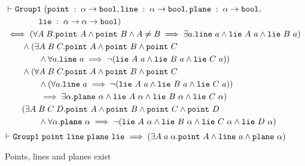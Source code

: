 \begin{figure}
  \begin{align*}
    &\vdash\code{Group1}\ (\code{point}\;:\;\alpha\rightarrow\code{bool}, \code{line}\;:\;\alpha\rightarrow\code{bool},\code{plane}\;:\;\alpha\rightarrow\code{bool},\\
    &\qquad\qquad\code{lie}\;:\;\alpha\rightarrow\alpha\rightarrow\code{bool})\\
    &\iff (\forall A\; B. \code{point}\ A \wedge \code{point}\ B \wedge A \neq B \implies \exists a. \code{line}\ a \wedge \code{lie}\ A\ a \wedge \code{lie}\ B\ a)\\
    &\qquad\wedge (\exists A\;B\;C. \code{point}\ A \wedge \code{point}\ B \wedge \code{point}\ C\\
    &\qquad\qquad\wedge \forall a. \code{line}\ a \implies \neg(\code{lie}\ A\ a \wedge \code{lie}\ B\ a \wedge \code{lie}\ C\ a))\\
    &\qquad\wedge(\forall A\;B\;C. \code{point}\ A \wedge \code{point}\ B \wedge \code{point}\ C\\
    &\qquad\qquad\wedge (\forall a. \code{line}\ a \implies \neg(\code{lie}\ A\ a \wedge \code{lie}\ B\ a \wedge \code{lie}\ C\ a))\\
    &\qquad\qquad\implies\exists\alpha. \code{plane}\ \alpha \wedge \code{lie}\ A\ \alpha \wedge \code{lie}\ B\ \alpha \wedge \code{lie}\ C\ \alpha)\\
    &\qquad (\exists A\;B\;C\;D. \code{point}\ A \wedge \code{point}\ B \wedge \code{point}\ C \wedge \code{point}\ D\\
    &\qquad\qquad \wedge \forall\alpha. \code{plane}\ \alpha \implies \neg(\code{lie}\ A\ \alpha \wedge \code{lie}\ B\ \alpha \wedge \code{lie}\ C\ \alpha \wedge \code{lie}\ D\ \alpha)\\
  \end{align*}
  \begin{displaymath}
    \vdash \texttt{Group1}\ \texttt{point}\ \texttt{line}\ \texttt{plane}\ \texttt{lie} \implies (\exists A\;a\;\alpha. \texttt{point}\ A \wedge \texttt{line}\ a \wedge \texttt{plane}\ \alpha)
  \end{displaymath}
\caption{Points, lines and planes exist}
\label{fig:InhabitedTypes}
\end{figure}

